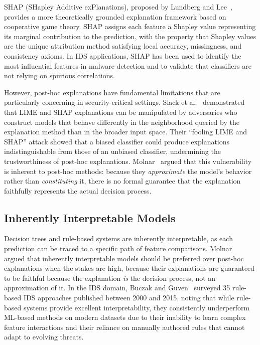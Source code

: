 \documentclass[12pt, letterpaper, oneside]{report}
\begin{document}
SHAP (SHapley Additive exPlanations), proposed by Lundberg and Lee~\citep{lundberg2017}, provides a more theoretically grounded explanation framework based on cooperative game theory. SHAP assigns each feature a Shapley value representing its marginal contribution to the prediction, with the property that Shapley values are the unique attribution method satisfying local accuracy, missingness, and consistency axioms. In IDS applications, SHAP has been used to identify the most influential features in malware detection and to validate that classifiers are not relying on spurious correlations.

However, post-hoc explanations have fundamental limitations that are particularly concerning in security-critical settings. Slack et al.~\citep{slack2020} demonstrated that LIME and SHAP explanations can be manipulated by adversaries who construct models that behave differently in the neighborhood queried by the explanation method than in the broader input space. Their ``fooling LIME and SHAP'' attack showed that a biased classifier could produce explanations indistinguishable from those of an unbiased classifier, undermining the trustworthiness of post-hoc explanations. Molnar~\citep{molnar2020} argued that this vulnerability is inherent to post-hoc methods: because they \emph{approximate} the model's behavior rather than \emph{constituting} it, there is no formal guarantee that the explanation faithfully represents the actual decision process.

\subsection{Inherently Interpretable Models}

Decision trees and rule-based systems are inherently interpretable, as each prediction can be traced to a specific path of feature comparisons. Molnar~\citep{molnar2020} argued that inherently interpretable models should be preferred over post-hoc explanations when the stakes are high, because their explanations are guaranteed to be faithful because the explanation \emph{is} the decision process, not an approximation of it. In the IDS domain, Buczak and Guven~\citep{buczak2016} surveyed 35 rule-based IDS approaches published between 2000 and 2015, noting that while rule-based systems provide excellent interpretability, they consistently underperform ML-based methods on modern datasets due to their inability to learn complex feature interactions and their reliance on manually authored rules that cannot adapt to evolving threats.
\end{document}
